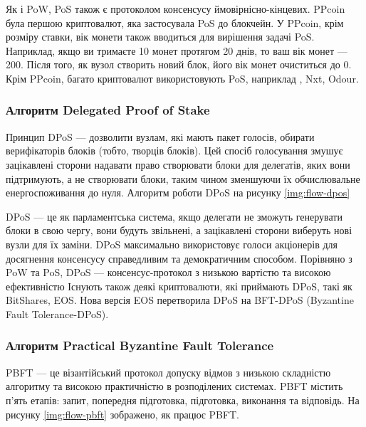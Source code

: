\documentclass{lib/styles/default-style}
\begin{document}
    Як і PoW, PoS також є протоколом консенсусу ймовірнісно-кінцевих.
    PPcoin була першою криптовалют, яка застосувала PoS до блокчейн.
    У PPcoin, крім розміру ставки, вік монети також вводиться для вирішення задачі PoS.
    Наприклад, якщо ви тримаєте 10 монет протягом 20 днів, то ваш вік монет --- 200.
    Після того, як вузол створить новий блок, його вік монет очиститься до 0.
    Крім PPcoin, багато криптовалют використовують PoS, наприклад , Nxt, Odour.

    \subsubsection{Алгоритм Delegated Proof of Stake}

    Принцип DPoS --- дозволити вузлам, які мають пакет голосів,
    обирати верифікаторів блоків (тобто, творців блоків).
    Цей спосіб голосування змушує зацікавлені сторони надавати право створювати блоки для делегатів, яких вони підтримують,
    а не створювати блоки, таким чином зменшуючи їх обчислювальне енергоспоживання до нуля.
    Алгоритм роботи DPoS на рисунку \ref{img:flow-dpos}

    
    DPoS --- це як парламентська система, якщо делегати не зможуть генерувати блоки в свою чергу,
    вони будуть звільнені, а зацікавлені сторони виберуть нові вузли для їх заміни. DPoS максимально використовує
    голоси акціонерів для досягнення консенсусу справедливим та демократичним способом.
    Порівняно з PoW та PoS, DPoS --- консенсус-протокол з низькою вартістю та високою ефективністю
    Існують також деякі криптовалюти, які приймають DPoS, такі як BitShares, EOS.
    Нова версія EOS перетворила DPoS на BFT-DPoS (Byzantine Fault Tolerance-DPoS).

    \subsubsection{Алгоритм Practical Byzantine Fault Tolerance}

    PBFT --- це візантійський протокол допуску відмов з низькою складністю алгоритму та високою практичністю в розподілених системах.
    PBFT містить п’ять етапів: запит, попередня підготовка, підготовка, виконання та відповідь. На рисунку \ref{img:flow-pbft}
    зображено, як працює PBFT.

\end{document}
